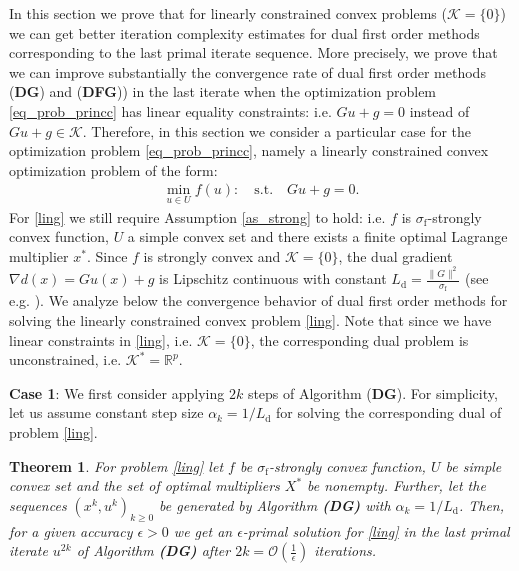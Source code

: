 \documentclass{gOMS2e}
\theoremstyle{plain}
\newtheorem{theorem}{Theorem}[section]
\theoremstyle{definition}
\theoremstyle{remark}
\begin{document}
In this section we prove that for linearly constrained convex
problems (${\mathcal{K}} = \{0\}$) we can get better iteration complexity estimates for dual first order methods  corresponding to the last primal iterate sequence.  More precisely, we prove
that we can improve substantially the convergence rate of  dual
first order methods (\textbf{DG}) and (\textbf{DFG}))  in the last
iterate when the optimization problem \eqref{eq_prob_princc} has
linear equality constraints:  i.e.  $Gu + g =0$ instead of $Gu +g \in {\mathcal{K}}$. Therefore, in this section we consider a particular case for the  optimization
problem \eqref{eq_prob_princc}, namely  a linearly constrained
convex optimization problem of the form:
\begin{align}
\label{ling} \min_{u \in U} f(u): \quad \text{s.t.} \quad  Gu + g
=0.
\end{align}
For \eqref{ling} we still require Assumption \eqref{as_strong} to hold: i.e. $f$ is $\sigma_\text{f}$-strongly convex function, $U$
a simple convex set and there exists a finite optimal Lagrange multiplier $x^*$.
Since $f$ is strongly convex and ${\mathcal{K}} = \{0\}$, the dual gradient $\nabla d(x) =  G u(x) + g$ is Lipschitz continuous with constant $L_\text{d} =
\frac{\|G\|^2}{\sigma_\text{f}}$  (see e.g. \cite{Nes:05}). We
analyze below the convergence behavior of dual first order methods
for solving the linearly constrained  convex problem
\eqref{ling}. Note that since we have linear constraints in
\eqref{ling}, i.e.  ${\mathcal{K}} = \{0\}$, the  corresponding  dual problem is unconstrained, i.e. ${{\mathcal{K}}^*} = {\mathbb{R}}^p$.

\vspace{0.2cm}

\noindent \textbf{Case 1}:  We first consider  applying  $2k$ steps of  Algorithm  (\textbf{DG}).  For simplicity,   let us assume constant step size $\alpha_k =
1/L_\text{d}$ for solving the corresponding  dual of  problem
\eqref{ling}.

\begin{theorem}
\label{th_lingdglast} For problem \eqref{ling} let $f$  be
$\sigma_\text{f}$-strongly convex function, $U$   be simple convex set
and the set of optimal multipliers $X^*$ be nonempty. Further,  let the
sequences $\left(x^k,u^k\right)_{k\geq 0}$ be generated by Algorithm
{\bf (DG)} with $\alpha_k = 1/L_\text{d}$. Then, for a given
accuracy $\epsilon>0$ we get an $\epsilon$-primal solution for
\eqref{ling} in the last primal  iterate $u^{2k}$ of Algorithm
\textbf{(DG)} after $2k = {\mathcal O} (\frac{1}{\epsilon})$
iterations.
\end{theorem}
\end{document}
